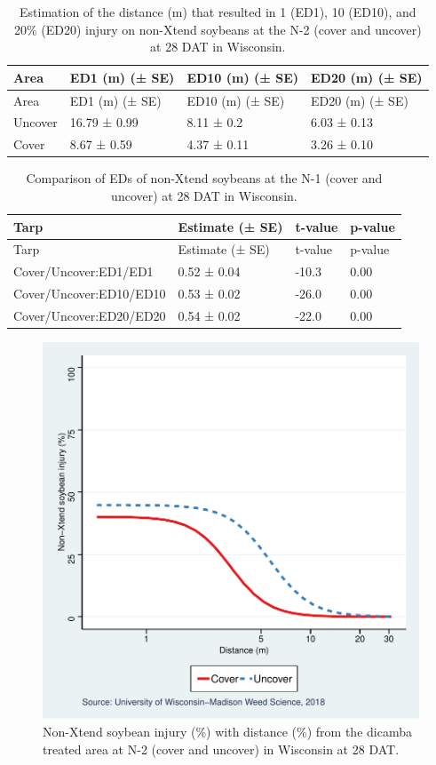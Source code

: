 \documentclass[]{article}
\begin{document}
\begin{longtable}[]{@{}llll@{}}
\caption{Estimation of the distance (m) that resulted in 1 (ED1), 10
(ED10), and 20\% (ED20) injury on non-Xtend soybeans at the N-2 (cover
and uncover) at 28 DAT in Wisconsin.}\tabularnewline
\toprule
Area & ED1 (m) (± SE) & ED10 (m) (± SE) & ED20 (m) (± SE)\tabularnewline
\midrule
\endfirsthead
\toprule
Area & ED1 (m) (± SE) & ED10 (m) (± SE) & ED20 (m) (± SE)\tabularnewline
\midrule
\endhead
Uncover & 16.79 ± 0.99 & 8.11 ± 0.2 & 6.03 ± 0.13\tabularnewline
Cover & 8.67 ± 0.59 & 4.37 ± 0.11 & 3.26 ± 0.10\tabularnewline
\bottomrule
\end{longtable}

\begin{longtable}[]{@{}llll@{}}
\caption{Comparison of EDs of non-Xtend soybeans at the N-1 (cover and
uncover) at 28 DAT in Wisconsin.}\tabularnewline
\toprule
Tarp & Estimate (± SE) & t-value & p-value\tabularnewline
\midrule
\endfirsthead
\toprule
Tarp & Estimate (± SE) & t-value & p-value\tabularnewline
\midrule
\endhead
Cover/Uncover:ED1/ED1 & 0.52 ± 0.04 & -10.3 & 0.00\tabularnewline
Cover/Uncover:ED10/ED10 & 0.53 ± 0.02 & -26.0 & 0.00\tabularnewline
Cover/Uncover:ED20/ED20 & 0.54 ± 0.02 & -22.0 & 0.00\tabularnewline
\bottomrule
\end{longtable}

\begin{figure}
\centering
\includegraphics{Report_Dicamba_study_files/figure-latex/unnamed-chunk-98-1.pdf}
\caption{Non-Xtend soybean injury (\%) with distance (\%) from the
dicamba treated area at N-2 (cover and uncover) in Wisconsin at 28 DAT.}
\end{figure}
\end{document}
